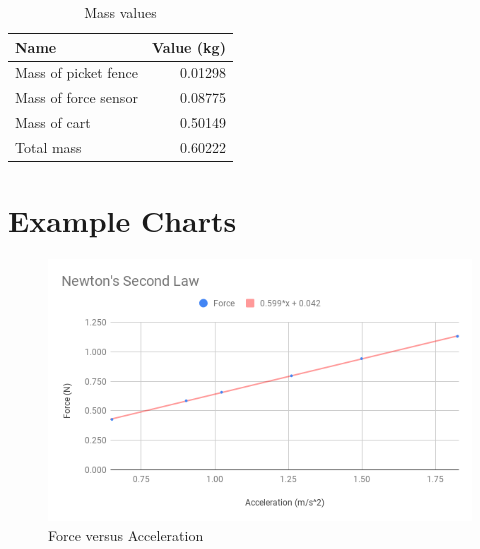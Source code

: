 %
\newpage
\begin{table}[ht]
    \centering
    \begin{tabular}{l|r}
        \textbf{Name} & \textbf{Value} (kg) \\
        \hline
        Mass of picket fence & 0.01298 \\
        Mass of force sensor & 0.08775 \\
        Mass of cart & 0.50149 \\
        \hline
        Total mass & 0.60222 \\
        \hline
    \end{tabular}
    \caption{Mass values}
    \label{table:04.masses}
\end{table}
%
\FloatBarrier
\newpage
\section{Example Charts}
%
\begin{figure}[ht]
    \centering
    \includegraphics[scale=0.71]{image/04-second-law/newton-2nd-law.png}
    \caption{Force versus Acceleration}
    \label{figure:04.fma}
\end{figure}